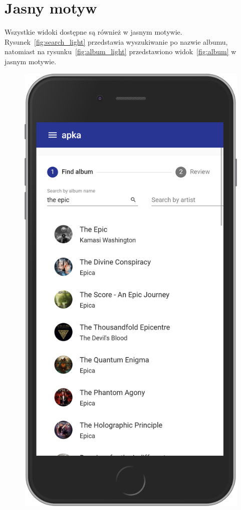 \section{Jasny motyw}
	Wszystkie widoki dostępne są również w jasnym motywie.
	Rysunek~\ref{fig:search_light} przedstawia wyszukiwanie po nazwie albumu,
	natomiast na rysunku~\ref{fig:album_light} przedstawiono widok~\ref{fig:album} w jasnym motywie.
	\begin{figure}[H]
		\centering
		\begin{minipage}{.5\textwidth}
			\includegraphics[width=0.9\linewidth]{rys06/search_light.png}

\end{minipage}
\end{figure}
